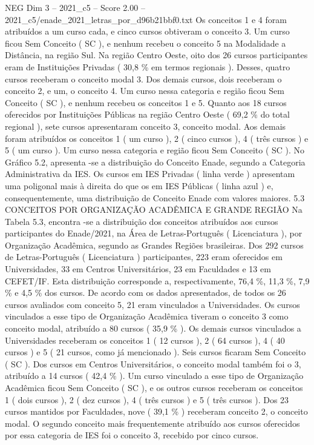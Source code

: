 \begin{textsample}{NEG Dim 3 – 2021\_c5 – Score 2.00 – 2021\_c5/enade\_2021\_letras\_por\_d96b21bbf0.txt}
Os conceitos 1 e 4 foram atribuídos a um curso cada, e cinco cursos obtiveram o conceito 3.
Um curso ficou Sem Conceito ( SC ), e nenhum recebeu o conceito 5 na Modalidade a Distância, na região Sul.
Na região Centro Oeste, oito dos 26 cursos participantes eram de Instituições Privadas ( 30,8 \% em termos regionais ).
Desses, quatro cursos receberam o conceito modal 3.
Dos demais cursos, dois receberam o conceito 2, e um, o conceito 4.
Um curso nessa categoria e região ficou Sem Conceito ( SC ), e nenhum recebeu os conceitos 1 e 5.
Quanto aos 18 cursos oferecidos por Instituições Públicas na região Centro Oeste ( 69,2 \% do total regional ), sete cursos apresentaram conceito 3, conceito modal.
Aos demais foram atribuídos os conceitos 1 ( um curso ), 2 ( cinco cursos ), 4 ( três cursos ) e 5 ( um curso ).
Um curso nessa categoria e região ficou Sem Conceito ( SC ).
No Gráfico 5.2, apresenta -se a distribuição do Conceito Enade, segundo a Categoria Administrativa da IES.
Os cursos em IES Privadas ( linha verde ) apresentam uma poligonal mais à direita do que os em IES Públicas ( linha azul ) e, consequentemente, uma distribuição de Conceito Enade com valores maiores. 5.3 CONCEITOS POR ORGANIZAÇÃO ACADÊMICA E GRANDE REGIÃO Na Tabela 5.3, encontra -se a distribuição dos conceitos atribuídos aos cursos participantes do Enade/2021, na Área de Letras-Português ( Licenciatura ), por Organização Acadêmica, segundo as Grandes Regiões brasileiras.
Dos 292 cursos de Letras-Português ( Licenciatura ) participantes, 223 eram oferecidos em Universidades, 33 em Centros Universitários, 23 em Faculdades e 13 em CEFET/IF.
Esta distribuição corresponde a, respectivamente, 76,4 \%, 11,3 \%, 7,9 \% e 4,5 \% dos cursos.
De acordo com os dados apresentados, de todos os 26 cursos avaliados com conceito 5, 21 eram vinculados a Universidades.
Os cursos vinculados a esse tipo de Organização Acadêmica tiveram o conceito 3 como conceito modal, atribuído a 80 cursos ( 35,9 \% ).
Os demais cursos vinculados a Universidades receberam os conceitos 1 ( 12 cursos ), 2 ( 64 cursos ), 4 ( 40 cursos ) e 5 ( 21 cursos, como já mencionado ).
Seis cursos ficaram Sem Conceito ( SC ).
Dos cursos em Centros Universitários, o conceito modal também foi o 3, atribuído a 14 cursos ( 42,4 \% ).
Um curso vinculado a esse tipo de Organização Acadêmica ficou Sem Conceito ( SC ), e os outros cursos receberam os conceitos 1 ( dois cursos ), 2 ( dez cursos ), 4 ( três cursos ) e 5 ( três cursos ).
Dos 23 cursos mantidos por Faculdades, nove ( 39,1 \% ) receberam conceito 2, o conceito modal.
O segundo conceito mais frequentemente atribuído aos cursos oferecidos por essa categoria de IES foi o conceito 3, recebido por cinco cursos.

\end{textsample}
